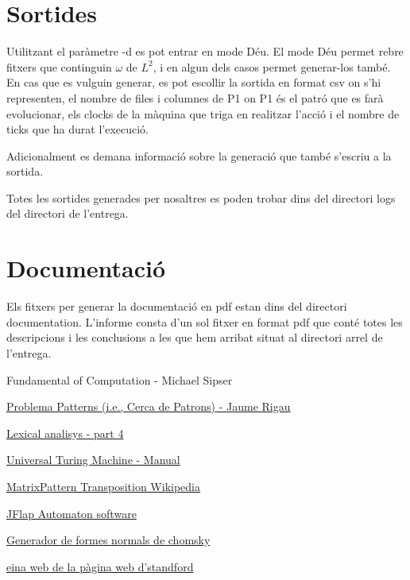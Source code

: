 \documentclass[12pt,a4paper]{report}
\def \w{$\omega$}
\def \ld{$L^{2}$}
\begin{document}
\section{Sortides}

Utilitzant el paràmetre -d es pot entrar en mode Déu. El mode Déu permet rebre fitxers que continguin \w{} de \ld{}, i en algun dels casos permet generar-los també. En cas que es vulguin generar, es pot escollir la sortida en format csv on s'hi representen, el nombre de files i columnes de P1 on P1 és el patró que es farà evolucionar, els clocks de la màquina que triga en realitzar l'acció i el nombre de ticks que ha durat l'execució. 

Adicionalment es demana informació sobre la generació que també s'escriu a la sortida. 

Totes les sortides generades per nosaltres es poden trobar dins del directori logs del directori de l'entrega.

\section{Documentació}

Els fitxers per generar la documentació en pdf estan dins del directori documentation. L'informe consta d'un sol fitxer en format pdf que conté totes les descripcions i les conclusions a les que hem arribat situat al directori arrel de l'entrega. 

\begin{thebibliography}{9}
Fundamental of Computation - Michael Sipser

\href{http://ima.udg.edu/~rigau/FC/FC_patterns.pdf}{Problema Patterns (i.e., Cerca de Patrons) - Jaume Rigau}

\href{http://ima.udg.edu/~rigau/FC/MFAP.pdf}{Lexical analisys - part 4}

\href{http://ima.udg.edu/~rigau/FC/utm_read_me.pdf}{Universal Turing Machine - Manual}

\href{https://en.wikipedia.org/wiki/Transpose}{MatrixPattern Transposition Wikipedia}

\href{http://www.jflap.org/}{JFlap Automaton software}

\href{https://mpeveler.com/assets/content/projects/cfg2cnf.php}{Generador de formes normals de chomsky}

\href{https://web.stanford.edu/class/archive/cs/cs103/cs103.1156/tools/cfg/}{eina web de la pàgina web d’standford}

\end{thebibliography}

\printindex
\end{document}
